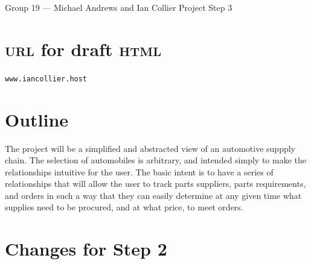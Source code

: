 \documentclass[11pt,letterpaper,oneside]{amsart}
\begin{document}
Group 19 --- Michael Andrews and Ian Collier
Project Step 3

\section*{\textsc{url} for draft \textsc{html}}

\texttt{www.iancollier.host}

\section*{Outline}

The project will be a simplified and abstracted view of an automotive suppply chain.  The selection of automobiles is arbitrary, and intended simply to make the relationships intuitive for the user.  The basic intent is to have a series of relationships that will allow the user to track parts suppliers, parts requirements, and orders in such a way that they can easily determine at any given time what supplies need to be procured, and at what price, to meet orders.

\section*{Changes for Step 2}
\end{document}
